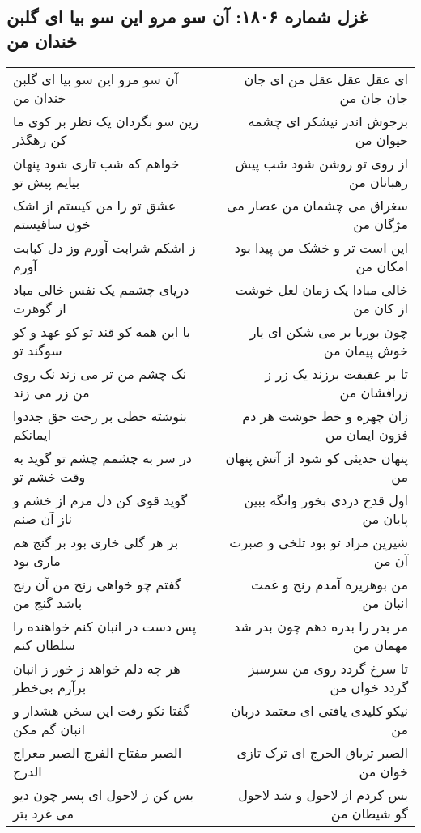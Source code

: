 \begin{center}
\section*{غزل شماره ۱۸۰۶: آن سو مرو این سو بیا ای گلبن خندان من}
\label{sec:1806}
\begin{longtable}{l p{0.5cm} r}
آن سو مرو این سو بیا ای گلبن خندان من
&&
ای عقل عقل عقل من ای جان جان جان من
\\
زین سو بگردان یک نظر بر کوی ما کن رهگذر
&&
برجوش اندر نیشکر ای چشمه حیوان من
\\
خواهم که شب تاری شود پنهان بیایم پیش تو
&&
از روی تو روشن شود شب پیش رهبانان من
\\
عشق تو را من کیستم از اشک خون ساقیستم
&&
سغراق می چشمان من عصار می مژگان من
\\
ز اشکم شرابت آورم وز دل کبابت آورم
&&
این است تر و خشک من پیدا بود امکان من
\\
دریای چشمم یک نفس خالی مباد از گوهرت
&&
خالی مبادا یک زمان لعل خوشت از کان من
\\
با این همه کو قند تو کو عهد و کو سوگند تو
&&
چون بوریا بر می شکن ای یار خوش پیمان من
\\
نک چشم من تر می زند نک روی من زر می زند
&&
تا بر عقیقت برزند یک زر ز زرافشان من
\\
بنوشته خطی بر رخت حق جددوا ایمانکم
&&
زان چهره و خط خوشت هر دم فزون ایمان من
\\
در سر به چشمم چشم تو گوید به وقت خشم تو
&&
پنهان حدیثی کو شود از آتش پنهان من
\\
گوید قوی کن دل مرم از خشم و ناز آن صنم
&&
اول قدح دردی بخور وانگه ببین پایان من
\\
بر هر گلی خاری بود بر گنج هم ماری بود
&&
شیرین مراد تو بود تلخی و صبرت آن من
\\
گفتم چو خواهی رنج من آن رنج باشد گنج من
&&
من بوهریره آمدم رنج و غمت انبان من
\\
پس دست در انبان کنم خواهنده را سلطان کنم
&&
مر بدر را بدره دهم چون بدر شد مهمان من
\\
هر چه دلم خواهد ز خور ز انبان برآرم بی‌خطر
&&
تا سرخ گردد روی من سرسبز گردد خوان من
\\
گفتا نکو رفت این سخن هشدار و انبان گم مکن
&&
نیکو کلیدی یافتی ای معتمد دربان من
\\
الصبر مفتاح الفرج الصبر معراج الدرج
&&
الصیر تریاق الحرج ای ترک تازی خوان من
\\
بس کن ز لاحول ای پسر چون دیو می غرد بتر
&&
بس کردم از لاحول و شد لاحول گو شیطان من
\\
\end{longtable}
\end{center}
